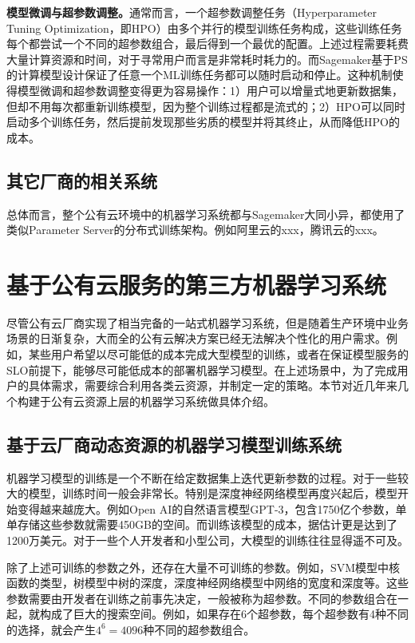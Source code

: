 \textbf{模型微调与超参数调整。}通常而言，一个超参数调整任务（Hyperparameter Tuning Optimization，即HPO）由多个并行的模型训练任务构成，这些训练任务每个都尝试一个不同的超参数组合，最后得到一个最优的配置。上述过程需要耗费大量计算资源和时间，对于寻常用户而言是非常耗时耗力的。而Sagemaker基于PS的计算模型设计保证了任意一个ML训练任务都可以随时启动和停止。这种机制使得模型微调和超参数调整变得更为容易操作：1）用户可以增量式地更新数据集，但却不用每次都重新训练模型，因为整个训练过程都是流式的；2）HPO可以同时启动多个训练任务，然后提前发现那些劣质的模型并将其终止，从而降低HPO的成本。

\subsection{其它厂商的相关系统}
总体而言，整个公有云环境中的机器学习系统都与Sagemaker大同小异，都使用了类似Parameter Server的分布式训练架构。例如阿里云的xxx，腾讯云的xxx。

\section{基于公有云服务的第三方机器学习系统}
尽管公有云厂商实现了相当完备的一站式机器学习系统，但是随着生产环境中业务场景的日渐复杂，大而全的公有云解决方案已经无法解决个性化的用户需求。例如，某些用户希望以尽可能低的成本完成大型模型的训练，或者在保证模型服务的SLO前提下，能够尽可能低成本的部署机器学习模型。在上述场景中，为了完成用户的具体需求，需要综合利用各类云资源，并制定一定的策略。本节对近几年来几个构建于公有云资源上层的机器学习系统做具体介绍。
\subsection{基于云厂商动态资源的机器学习模型训练系统}
机器学习模型的训练是一个不断在给定数据集上迭代更新参数的过程。对于一些较大的模型，训练时间一般会非常长。特别是深度神经网络模型再度兴起后，模型开始变得越来越庞大。例如Open AI的自然语言模型GPT-3，包含1750亿个参数，单单存储这些参数就需要450GB的空间。而训练该模型的成本，据估计更是达到了1200万美元。对于一些个人开发者和小型公司，大模型的训练往往显得遥不可及。

除了上述可训练的参数之外，还存在大量不可训练的参数。例如，SVM模型中核函数的类型，树模型中树的深度，深度神经网络模型中网络的宽度和深度等。这些参数需要由开发者在训练之前事先决定，一般被称为超参数。不同的参数组合在一起，就构成了巨大的搜索空间。例如，如果存在6个超参数，每个超参数有4种不同的选择，就会产生$4^6=4096$种不同的超参数组合。


